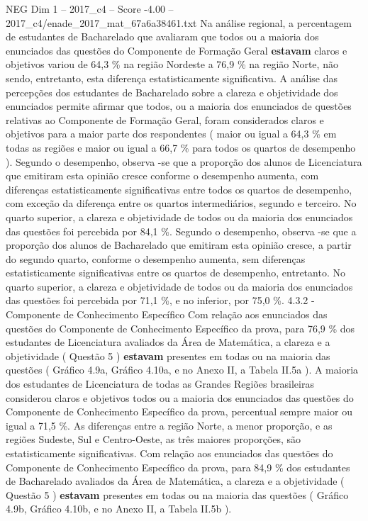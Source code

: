 \begin{textsample}{NEG Dim 1 – 2017\_c4 – Score -4.00 – 2017\_c4/enade\_2017\_mat\_67a6a38461.txt}
Na análise regional, a percentagem de estudantes de Bacharelado que avaliaram que todos ou a maioria dos enunciados das questões do Componente de Formação Geral \textbf{estavam} claros e objetivos variou de 64,3 \% na região Nordeste a 76,9 \% na região Norte, não sendo, entretanto, esta diferença estatisticamente significativa.
A análise das percepções dos estudantes de Bacharelado sobre a clareza e objetividade dos enunciados permite afirmar que todos, ou a maioria dos enunciados de questões relativas ao Componente de Formação Geral, foram considerados claros e objetivos para a maior parte dos respondentes ( maior ou igual a 64,3 \% em todas as regiões e maior ou igual a 66,7 \% para todos os quartos de desempenho ).
Segundo o desempenho, observa -se que a proporção dos alunos de Licenciatura que emitiram esta opinião cresce conforme o desempenho aumenta, com diferenças estatisticamente significativas entre todos os quartos de desempenho, com exceção da diferença entre os quartos intermediários, segundo e terceiro.
No quarto superior, a clareza e objetividade de todos ou da maioria dos enunciados das questões foi percebida por 84,1 \%.
Segundo o desempenho, observa -se que a proporção dos alunos de Bacharelado que emitiram esta opinião cresce, a partir do segundo quarto, conforme o desempenho aumenta, sem diferenças estatisticamente significativas entre os quartos de desempenho, entretanto.
No quarto superior, a clareza e objetividade de todos ou da maioria dos enunciados das questões foi percebida por 71,1 \%, e no inferior, por 75,0 \%. 4.3.2 - Componente de Conhecimento Específico Com relação aos enunciados das questões do Componente de Conhecimento Específico da prova, para 76,9 \% dos estudantes de Licenciatura avaliados da Área de Matemática, a clareza e a objetividade ( Questão 5 ) \textbf{estavam} presentes em todas ou na maioria das questões ( Gráfico 4.9a, Gráfico 4.10a, e no Anexo II, a Tabela II.5a ).
A maioria dos estudantes de Licenciatura de todas as Grandes Regiões brasileiras considerou claros e objetivos todos ou a maioria dos enunciados das questões do Componente de Conhecimento Específico da prova, percentual sempre maior ou igual a 71,5 \%.
As diferenças entre a região Norte, a menor proporção, e as regiões Sudeste, Sul e Centro-Oeste, as três maiores proporções, são estatisticamente significativas.
Com relação aos enunciados das questões do Componente de Conhecimento Específico da prova, para 84,9 \% dos estudantes de Bacharelado avaliados da Área de Matemática, a clareza e a objetividade ( Questão 5 ) \textbf{estavam} presentes em todas ou na maioria das questões ( Gráfico 4.9b, Gráfico 4.10b, e no Anexo II, a Tabela II.5b ).

\end{textsample}
